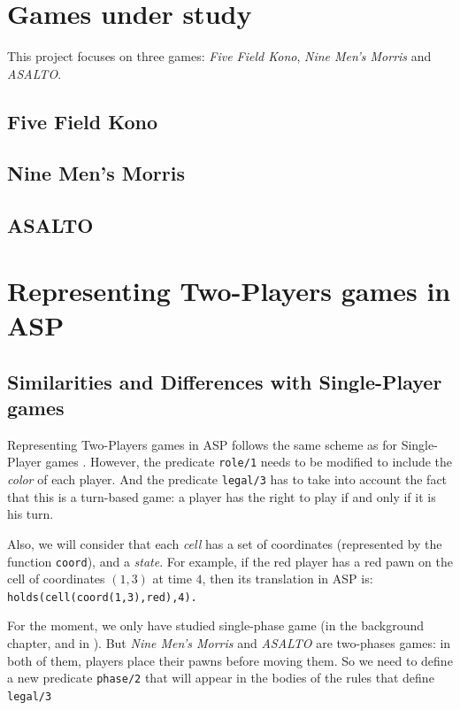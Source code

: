 \documentclass[12pt,twoside]{report}
\begin{document}
\section{Games under study}

This project focuses on three games: \textit{Five Field Kono}, \textit{Nine Men's Morris} and \textit{ASALTO}.

\subsection{Five Field Kono}


\subsection{Nine Men's Morris}

\subsection{ASALTO}

\section{Representing Two-Players games in ASP}

\subsection{Similarities and Differences with Single-Player games}

Representing Two-Players games in ASP follows the same scheme as for Single-Player games \cite{thielscher2009answer}. However, the predicate \texttt{role/1} needs to be modified to include the \textit{color} of each player. And the predicate \texttt{legal/3} has to take into account the fact that this is a turn-based game: a player has the right to play if and only if it is his turn.

\bigskip

Also, we will consider that each \textit{cell} has a set of coordinates (represented by the function \texttt{coord}), and a \textit{state}. For example, if the red player has a red pawn on the cell of coordinates $(1,3)$ at time $4$, then its translation in ASP is: \texttt{holds(cell(coord(1,3),red),4).}

\bigskip

For the moment, we only have studied single-phase game (in the background chapter, and in \cite{thielscher2009answer}). But \textit{Nine Men's Morris} and \textit{ASALTO} are two-phases games: in both of them, players place their pawns before moving them. So we need to define a new predicate \texttt{phase/2} that will appear in the bodies of the rules that define \texttt{legal/3}
\end{document}
